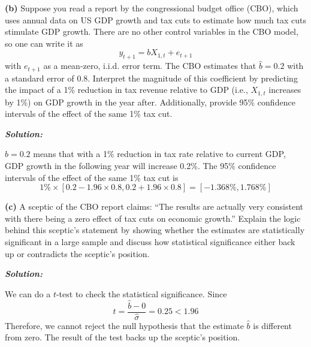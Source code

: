 \documentclass[12pt, letterpaper]{article}
\begin{document}
\vspace{1em}
\noindent\textbf{(b)} Suppose you read a report by the congressional budget office (CBO), which uses annual data on US GDP growth and tax cuts to estimate how much tax cuts stimulate GDP growth. There are no other control variables in the CBO model, so one can write it as
\begin{equation}
    \label{eq:sibalP3Q3_yX1}
    y_{t+1} = bX_{1,t} + e_{t+1}
\end{equation}
with $e_{t+1}$ as a mean-zero, i.i.d. error term. The CBO estimates that $\hat{b} = 0.2$ with a standard error of 0.8. Interpret the magnitude of this coefficient by predicting the impact of a 1\% reduction in tax revenue relative to GDP (i.e., $X_{1,t}$ increases by 1\%) on GDP growth in the year after. Additionally, provide 95\% confidence intervals of the effect of the same 1\% tax cut.

\begin{shaded}
\noindent\textbf{\textit{Solution:}}\par
$\hat{b} = 0.2$ means that with a 1\% reduction in tax rate relative to current GDP, GDP growth in the following year will increase 0.2\%. The 95\% confidence intervals of the effect of the same 1\% tax cut is
\begin{equation*}
    1\% \times [0.2 - 1.96 \times 0.8, 0.2 + 1.96 \times 0.8] = [-1.368\%, 1.768\%]
\end{equation*}
\end{shaded}


\vspace{1em}
\noindent\textbf{(c)} A sceptic of the CBO report claims: ``The results are actually very consistent with there being a zero effect of tax cuts on economic growth.'' Explain the logic behind this sceptic's statement by showing whether the estimates are statistically significant in a large sample and discuss how statistical significance either back up or contradicts the sceptic's position.

\begin{shaded}
\noindent\textbf{\textit{Solution:}}\par
We can do a $t$-test to check the statistical significance. Since
\begin{equation*}
    t = \frac{\hat{b} - 0}{\hat{\sigma}} = 0.25 < 1.96
\end{equation*}
Therefore, we cannot reject the null hypothesis that the estimate $\hat{b}$ is different from zero. The result of the test backs up the sceptic's position.
\end{shaded}
\end{document}
